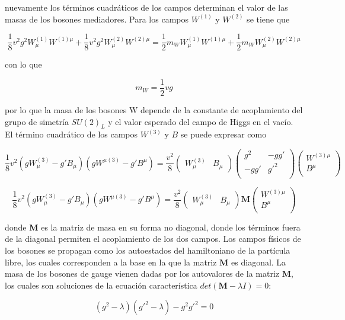nuevamente los términos cuadráticos de los campos determinan el valor de las masas de los bosones mediadores. Para los campos $W^{(1)}$ y $W^{(2)}$ se tiene que 

$$ \frac{1}{8}v^2g^2W_{\mu}^{(1)}W^{(1)\mu} + \frac{1}{8}v^2g^2 W_{\mu}^{(2)}W^{(2)\mu} = \frac{1}{2}m_WW_{\mu}^{(1)}W^{(1)\mu} + \frac{1}{2}m_WW_{\mu}^{(2)}W^{(2)\mu} $$

con lo que 

$$ m_W = \frac{1}{2}vg $$

por lo que la masa de los bosones W depende de la constante de acoplamiento del grupo de simetría $SU(2)_L$ y el valor esperado del campo de Higgs en el vacío. El término cuadrático de los campos $W^{(3)}$ y $B$ se puede expresar como

$$ \frac{1}{8}v^2(gW_{\mu}^{(3)}-g'B_{\mu})(gW^{\mu(3)}-g'B^{\mu}) = \frac{v^2}{8}\begin{pmatrix}
    W_{\mu}^{(3)} & B_{\mu}
\end{pmatrix} \begin{pmatrix}
    g^2 & -gg' \\
    -gg' & g'^2\\
\end{pmatrix} \begin{pmatrix}
    W^{(3)\mu}\\
    B^{\mu}\\
\end{pmatrix}$$

$$ \frac{1}{8}v^2(gW_{\mu}^{(3)}-g'B_{\mu})(gW^{\mu(3)}-g'B^{\mu}) = \frac{v^2}{8}\begin{pmatrix}
    W_{\mu}^{(3)} & B_{\mu}
\end{pmatrix}\textbf{M} \begin{pmatrix}
    W^{(3)\mu}\\
    B^{\mu}\\
\end{pmatrix} $$

donde \textbf{M} es la matriz de masa en su forma no diagonal, donde los términos fuera de la diagonal permiten el acoplamiento de los dos campos. Los campos físicos de los bosones se propagan como los autoestados del hamiltoniano de la partícula libre, los cuales corresponden a la base en la que la matriz \textbf{M} es diagonal. La masa de los bosones de gauge vienen dadas por los autovalores de la matriz \textbf{M}, los cuales son soluciones de la ecuación característica $det(\textbf{M} - \lambda I)=0$:

$$ (g^2 - \lambda)(g'^2 -\lambda) - g^2g'^2 = 0 $$

